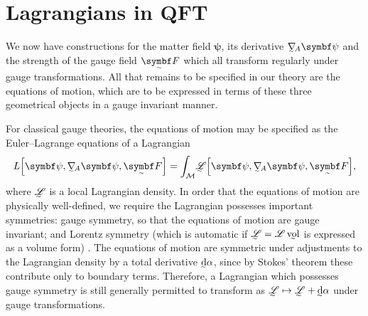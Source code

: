 






\section{Lagrangians in QFT}
\label{sec:Lagrangians}

We now have constructions for the matter field $\bm\psi$, its derivative $\ts\nabla_{\!A}\bm\psi$ and the strength of the gauge field $\tsbm F$ which all transform regularly under gauge transformations.
All that remains to be specified in our theory are the equations of motion, which are to be expressed in terms of these three geometrical objects in a gauge invariant manner.

For classical gauge theories, the equations of motion may be specified as the Euler--Lagrange equations of a Lagrangian
\begin{align}
	L\qty[\bm\psi, \ts\nabla_{\!A}\bm\psi, \tsbm F] = \int_{\cal M}\! \LL\qty[\bm\psi, \ts\nabla_{\!A}\bm\psi, \tsbm F]
,\end{align}
where $\LL$ is a local Lagrangian density.
In order that the equations of motion are physically well-defined, we require the Lagrangian possesses important symmetries: gauge symmetry, so that the equations of motion are gauge invariant; and Lorentz symmetry (which is automatic if $\LL = \mathscr{L}\,\vol$ is expressed as a volume form) \cite[§\,7.1]{Hamilton_2017}.
The equations of motion are symmetric under adjustments to the Lagrangian density by a total derivative $\ts\dd\alpha$, since by Stokes' theorem these contribute only to boundary terms.
Therefore, a Lagrangian which possesses gauge symmetry is still generally permitted to transform as
\begin{math}
	\LL \mapsto \LL + \ts\dd\alpha
\end{math}
under gauge transformations.

